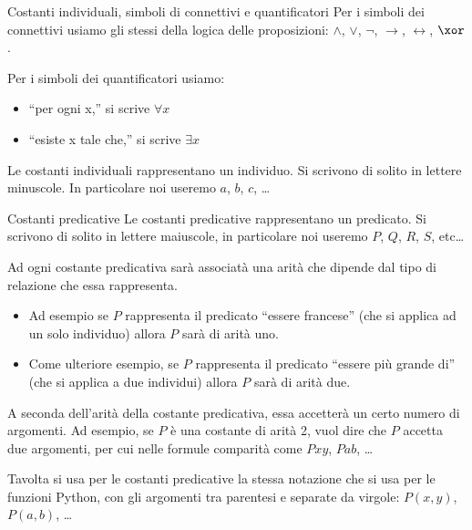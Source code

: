 \documentclass[aspectratio=169,10pt,dvipsnames,xcolor=table]{beamer}
\begin{document}
\begin{frame}{Costanti individuali, simboli di connettivi e quantificatori}
	Per i \alert{simboli dei connettivi} usiamo gli stessi della logica delle proposizioni: $\land$, $\lor$, $\lnot$, $\to$, $\leftrightarrow$, $\xor$.

	\pause\medskip
	Per i \alert{simboli dei quantificatori} usiamo:
	\begin{itemize}
		\item ``per ogni x,'' si scrive $\forall x$
		\item ``esiste x tale che,'' si scrive $\exists x$
	\end{itemize}

	\pause\medskip
	Le \alert{costanti individuali} rappresentano un individuo. Si scrivono di solito in lettere minuscole. In particolare noi useremo $a$, $b$, $c$, \ldots
\end{frame}

\begin{frame}{Costanti predicative}
	Le \alert{costanti predicative} rappresentano un predicato. Si scrivono di solito in lettere maiuscole, in particolare noi useremo $P$, $Q$, $R$, $S$, etc\ldots

	\pause\medskip
	Ad ogni costante predicativa sarà associatà una \alert{arità} che dipende dal tipo di relazione che essa rappresenta.
	\begin{itemize}
		\item Ad esempio se $P$ rappresenta il predicato ``essere francese'' (che si applica ad un solo individuo) allora $P$ sarà di arità uno.
		\item Come ulteriore esempio, se $P$ rappresenta il predicato ``essere più grande di'' (che si applica a due individui) allora $P$ sarà di arità due.
	\end{itemize}

	\pause\medskip
	A seconda dell'arità della costante predicativa, essa accetterà un certo numero di argomenti. Ad esempio, se $P$ è una costante di arità 2, vuol dire che $P$ accetta due argomenti, per cui nelle formule comparità come $Pxy$, $Pab$, \ldots

	\pause\medskip
	Tavolta si usa per le costanti predicative la stessa notazione che si usa per le funzioni Python, con gli argomenti tra parentesi e separate da virgole: $P(x,y)$, $P(a,b)$, \ldots
\end{frame}
\end{document}
